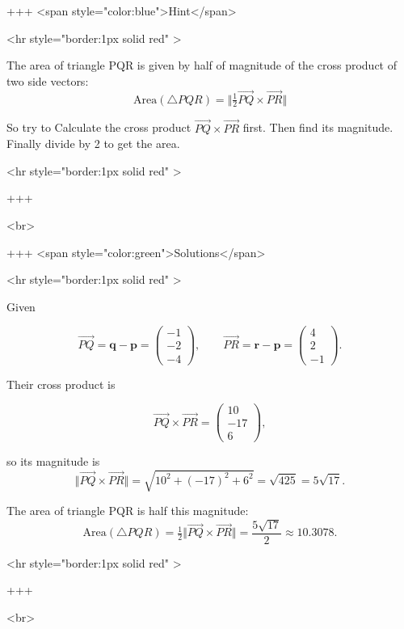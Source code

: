 +++ <span style="color:blue">Hint</span>

<hr style="border:1px solid red" >

The area of triangle PQR is given by half of magnitude of the cross product of two side vectors:
$$
\text{Area}(\triangle PQR)=\Vert \tfrac{1}{2}\overrightarrow{PQ}\times\overrightarrow{PR} \Vert
$$

So try to Calculate the cross product \(\overrightarrow{PQ}\times\overrightarrow{PR}\) first. Then find its magnitude. Finally divide by 2 to get the area.

<hr style="border:1px solid red" >

+++

<br>

+++ <span style="color:green">Solutions</span>

<hr style="border:1px solid red" >

Given

$$
\overrightarrow{PQ}=\mathbf{q}-\mathbf{p}=\begin{pmatrix}-1\\-2\\-4\end{pmatrix},\qquad
\overrightarrow{PR}=\mathbf{r}-\mathbf{p}=\begin{pmatrix}4\\2\\-1\end{pmatrix}.
$$

Their cross product is

$$
\overrightarrow{PQ}\times\overrightarrow{PR}=\begin{pmatrix}10\\-17\\6\end{pmatrix},
$$

so its magnitude is
$$
\Vert \overrightarrow{PQ}\times\overrightarrow{PR} \Vert
=\sqrt{10^2+(-17)^2+6^2}=\sqrt{425}=5\sqrt{17}.
$$

The area of triangle PQR is half this magnitude:
$$
\text{Area}(\triangle PQR)=\tfrac{1}{2} \Vert\overrightarrow{PQ}\times\overrightarrow{PR}\Vert
=\frac{5\sqrt{17}}{2}\approx 10.3078.
$$

<hr style="border:1px solid red" >

+++

<br>


